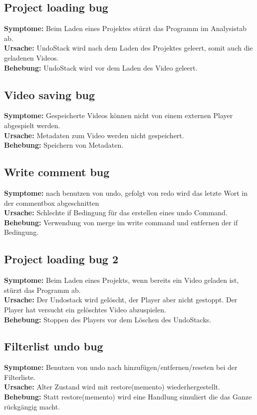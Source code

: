 \documentclass{scrartcl}
\begin{document}
{\subsection{Project loading bug}
\textbf{Symptome:} Beim Laden eines Projektes stürzt das Programm im Analysistab ab.\\
\textbf{Ursache:} UndoStack wird nach dem Laden des Projektes geleert, somit auch die geladenen Videos.\\
\textbf{Behebung:} UndoStack wird vor dem Laden des Video geleert.
\subsection{Video saving bug}
\textbf{Symptome:}
Gespeicherte Videos können nicht von einem externen Player abgespielt werden.\\
\textbf{Ursache:}
Metadaten zum Video werden nicht gespeichert.\\
\textbf{Behebung:}
Speichern von Metadaten.
\subsection{Write comment bug}
\textbf{Symptome:} nach benutzen von undo, gefolgt von redo wird das letzte Wort in der commentbox abgeschnitten\\
\textbf{Ursache:} Schlechte if Bedingung für das erstellen eines undo Command.\\
\textbf{Behebung:} Verwendung von merge im write command und entfernen der if Bedingung.
\subsection{Project loading bug 2}
\textbf{Symptome:}
Beim Laden eines Projekts, wenn bereits ein Video geladen ist, stürzt das Programm ab.\\
\textbf{Ursache:}
Der Undostack wird gelöscht, der Player aber nicht gestoppt. Der Player hat versucht ein gelöschtes Video abzuspielen.\\
\textbf{Behebung:}
Stoppen des Players vor dem Löschen des UndoStacks.\\
\subsection{Filterlist undo bug}
\textbf{Symptome:}
Benutzen von undo nach hinzufügen/entfernen/reseten bei der Filterliste.\\
\textbf{Ursache:}
Alter Zustand wird mit restore(memento) wiederhergestellt.\\
\textbf{Behebung:}
Statt restore(memento) wird eine Handlung simuliert die das Ganze rückgängig macht.
\newpage
}
\end{document}
